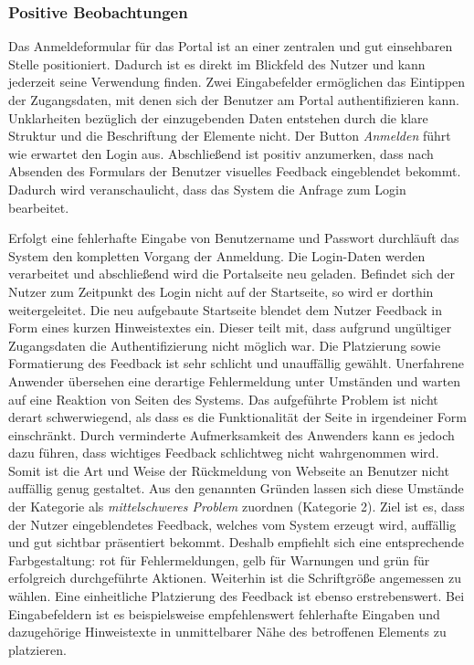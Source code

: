 \newpage
{}

\subsubsection*{Positive Beobachtungen}
Das Anmeldeformular für das Portal ist an einer zentralen und gut einsehbaren Stelle positioniert. Dadurch ist es direkt im Blickfeld des Nutzer und kann jederzeit seine Verwendung finden. Zwei Eingabefelder ermöglichen das Eintippen der Zugangsdaten, mit denen sich der Benutzer am Portal authentifizieren kann. Unklarheiten bezüglich der einzugebenden Daten entstehen durch die klare Struktur und die Beschriftung der Elemente nicht. Der Button \emph{Anmelden} führt wie erwartet den Login aus. Abschließend ist positiv anzumerken, dass nach Absenden des Formulars der Benutzer visuelles Feedback eingeblendet bekommt. Dadurch wird veranschaulicht, dass das System die Anfrage zum Login bearbeitet.

{
	Erfolgt eine fehlerhafte Eingabe von Benutzername und Passwort durchläuft das System den kompletten Vorgang der Anmeldung. Die Login-Daten werden verarbeitet und abschließend wird die Portalseite neu geladen. Befindet sich der Nutzer zum Zeitpunkt des Login nicht auf der Startseite, so wird er dorthin weitergeleitet. Die neu aufgebaute Startseite blendet dem Nutzer Feedback in Form eines kurzen Hinweistextes ein. Dieser teilt mit, dass aufgrund ungültiger Zugangsdaten die Authentifizierung nicht möglich war. Die Platzierung sowie Formatierung des Feedback ist sehr schlicht und unauffällig gewählt. Unerfahrene Anwender übersehen eine derartige Fehlermeldung unter Umständen und warten auf eine Reaktion von Seiten des Systems.
}
{
	Das aufgeführte Problem ist nicht derart schwerwiegend, als dass es die Funktionalität der Seite in irgendeiner Form einschränkt. Durch verminderte Aufmerksamkeit des Anwenders kann es jedoch dazu führen, dass wichtiges Feedback schlichtweg nicht wahrgenommen wird. Somit ist die Art und Weise der Rückmeldung von Webseite an Benutzer nicht auffällig genug gestaltet. Aus den genannten Gründen lassen sich diese Umstände der Kategorie als \emph{mittelschweres Problem} zuordnen (Kategorie 2).		
}
{
	Ziel ist es, dass der Nutzer eingeblendetes Feedback, welches vom System erzeugt wird, auffällig und gut sichtbar präsentiert bekommt. Deshalb empfiehlt sich eine entsprechende Farbgestaltung: rot für Fehlermeldungen, gelb für Warnungen und grün für erfolgreich durchgeführte Aktionen. Weiterhin ist die Schriftgröße angemessen zu wählen. Eine einheitliche Platzierung des Feedback ist ebenso erstrebenswert. Bei Eingabefeldern ist es beispielsweise empfehlenswert fehlerhafte Eingaben und dazugehörige Hinweistexte in unmittelbarer Nähe des betroffenen Elements zu platzieren.
}
\label{prob:suche:loginfehler}


